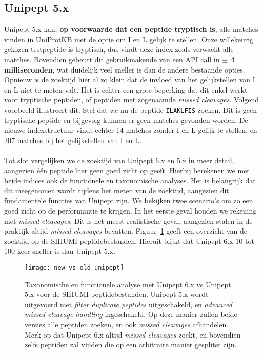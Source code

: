 \subsection{Unipept 5.x}
Unipept 5.x kan, \textbf{op voorwaarde dat een peptide tryptisch is}, alle matches vinden in UniProtKB met de optie om I en L gelijk te stellen.
Onze willekeurig gekozen testpeptide is tryptisch, dus vindt deze index zoals verwacht alle matches.
Bovendien gebeurt dit gebruikmakende van een API call in \textbf{$\pm$ 4 milliseconden}, wat duidelijk veel sneller is dan de andere bestaande opties.
Opnieuw is de zoektijd hier al zo klein dat de invloed van het gelijkstellen van I en L niet te meten valt.
Het is echter een grote beperking dat dit enkel werkt voor tryptische peptiden, of peptiden met zogenaamde \textit{missed cleavages}.
Volgend voorbeeld illustreert dit.
Stel dat we nu de peptide \texttt{ILAKLFIS} zoeken.
Dit is geen tryptische peptide en bijgevolg kunnen er geen matches gevonden worden.
De nieuwe indexstructuur vindt echter 14 matches zonder I en L gelijk te stellen, en 207 matches bij het gelijkstellen van I en L\@.
\\ \\
Tot slot vergelijken we de zoektijd van Unipept 6.x en 5.x in meer detail, aangezien één peptide hier geen goed zicht op geeft.
Hierbij berekenen we met beide indices ook de functionele en taxonomische analyses.
Het is belangrijk dat dit meegenomen wordt tijdens het meten van de zoektijd, aangezien dit fundamentele functies van Unipept zijn.
We bekijken twee scenario's om zo een goed zicht op de performantie te krijgen.
In het eerste geval houden we rekening met \textit{missed cleavages}.
Dit is het meest realistische geval, aangezien stalen in de praktijk altijd \textit{missed cleavages} bevatten.
Figuur~\ref{fig:new_vs_old_unipept} geeft een overzicht van de zoektijd op de SIHUMI peptidebestanden.
Hieruit blijkt dat Unipept 6.x 10 tot 100 keer sneller is dan Unipept 5.x.
\\
\begin{figure}[H]
    \centering
    \texttt{[image: new\_vs\_old\_unipept]}
    \caption{Taxonomische en functionele analyse met Unipept 6.x vs Unipept 5.x voor de SIHUMI peptidebestanden. Unipept 5.x wordt uitgevoerd met \textit{filter duplicate peptides} uitgeschakeld, en \textit{advanced missed cleavage handling} ingeschakeld. Op deze manier zullen beide versies alle peptiden zoeken, en ook \textit{missed cleavages} afhandelen. Merk op dat Unipept 6.x altijd \textit{missed cleavages} zoekt, en bovendien zelfs peptiden zal vinden die op een arbitraire manier gesplitst zijn.}
    \label{fig:new_vs_old_unipept}
\end{figure}

